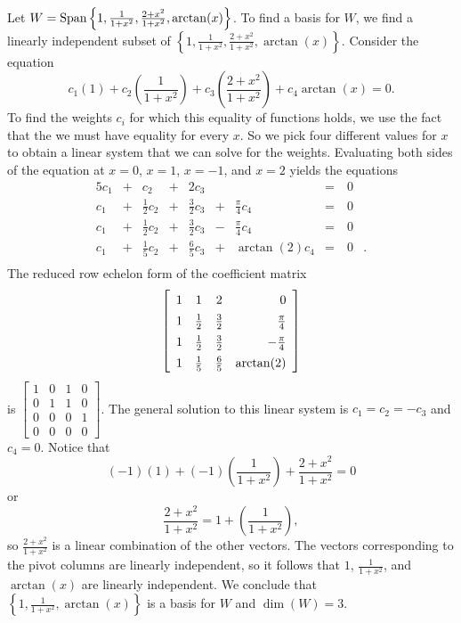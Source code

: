 \begin{example}
	\item Let $W = \text{Span}\left\{1, \frac{1}{1+x^2}, \frac{2+x^2}{1+x^2}, \arctan(x)\right\}$. To find a basis for $W$, we find a linearly independent subset of $\left\{1, \frac{1}{1+x^2}, \frac{2+x^2}{1+x^2}, \arctan(x)\right\}$.  Consider the equation
	\[c_1 (1) + c_2\left(\frac{1}{1+x^2}\right) + c_3\left(\frac{2+x^2}{1+x^2}\right) + c_4 \arctan(x) = 0.\]
	To find the weights $c_i$ for which this equality of functions holds, we use the fact that the we must have equality for every $x$. So we pick four different values for $x$ to obtain a linear system that we can solve for the weights. Evaluating both sides of the equation at $x=0$, $x=1$, $x=-1$, and $x=2$ yields the equations
	\begin{alignat*}{5}
{}c_1 	&{}+{} 	&{}c_2		&{}+{}	&{2}c_3	&{}	&{}		&= \ &0&{} \\
{}c_1 	&{}+{} 	&{\frac{1}{2}}c_2	&{}+{}		&{\frac{3}{2}}c_3		&{}+{}	&{\frac{\pi}{4}}c_4		&= \ &0&{} \\
{}c_1 	&{}+{} 	&{\frac{1}{2}}c_2	&{}+{}		&{\frac{3}{2}}c_3		&{}-{}	&{\frac{\pi}{4}}c_4		&= \ &0&{} \\
{}c_1 	&{}+{} 	&{\frac{1}{5}}c_2	&{}+{}		&{\frac{6}{5}}c_3		&{}+{}	&{\arctan(2)}c_4		&= \ &0&{.} \\
\end{alignat*}
The reduced row echelon form of the coefficient matrix 
\[\left[ \renewcommand{\arraystretch}{1.4} \begin{array}{cccr} 1&1&2&0 \\ 1&\frac{1}{2}&\frac{3}{2}&\frac{\pi}{4} \\ 1&\frac{1}{2}&\frac{3}{2}&-\frac{\pi}{4} \\ 1&\frac{1}{5}&\frac{6}{5}&\arctan(2) \end{array} \right]\]
is 
$\left[ \begin{array}{cccc} 1&0&1&0 \\ 0&1&1&0 \\ 0&0&0&1 \\ 0&0&0&0 \end{array} \right]$. The general solution to this linear system is $c_1 = c_2 = -c_3$ and $c_4 = 0$. Notice that 
\[(-1)(1) + (-1)\left( \frac{1}{1+x^2}\right) + \frac{2+x^2}{1+x^2} = 0\]
or
\[ \frac{2+x^2}{1+x^2} = 1 + \left( \frac{1}{1+x^2}\right),\]
so $\frac{2+x^2}{1+x^2}$ is a linear combination of the other vectors. The vectors corresponding to the pivot columns are linearly independent, so it follows that $1$, $\frac{1}{1+x^2}$, and $\arctan(x)$ are linearly independent. We conclude that $\left\{1, \frac{1}{1+x^2},  \arctan(x)\right\}$ is a basis for $W$ and $\dim(W) = 3$. 
	

\end{example}
